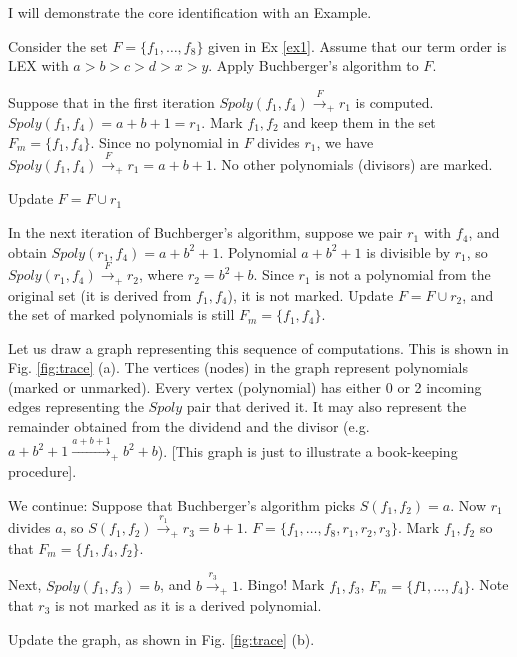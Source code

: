 I will demonstrate the core identification with an Example.

\begin{Example}
Consider the set $F = \{f_1, \dots, f_8\}$ given in Ex
\ref{ex1}. Assume that our term order is LEX with $a > b > c > d > x >
y$.  Apply Buchberger's algorithm to $F$. 

\ben
\item Suppose that in the first
iteration $Spoly(f_1, f_4) \xrightarrow{F}_+r_1$ is computed. 
$Spoly(f_1, f_4) = a+b+1 = r_1$. Mark $f_1, f_2$ and keep them in the
set $F_m = \{f_1, f_4\}$. Since no polynomial
in $F$ divides $r_1$, we have $Spoly(f_1, f_4) \xrightarrow{F}_+ r_1 =
a+b+1$. No other polynomials (divisors) are marked. 

\item Update $F = F \cup r_1$

\item In the next iteration of Buchberger's algorithm, suppose we pair
  $r_1$ with $f_4$, and obtain  $Spoly(r_1, f_4)  = a + b^2 +
  1$. Polynomial $a+b^2+1$ is divisible by $r_1$, so $Spoly(r_1,
  f_4)\xrightarrow{F}_+r_2$, where $r_2 = b^2 + b$. Since $r_1$ is not
  a polynomial from the original set (it is derived from $f_1, f_4$),
  it is not marked. Update $F = F \cup r_2$, and the set of marked
  polynomials is still $F_m = \{f_1, f_4\}$.

\item Let us draw a graph representing this sequence of
  computations. This is shown in Fig. \ref{fig:trace} (a). The
  vertices (nodes) in the graph represent polynomials (marked or
  unmarked). Every vertex (polynomial) has either 0 or 2 incoming
  edges representing the $Spoly$ pair that derived it. It may also
  represent the remainder obtained from the dividend and the divisor
  (e.g. $a+b^2+1 \xrightarrow{a+b+1}_+ b^2+b$). [This graph is just to
    illustrate a book-keeping procedure].

\item We continue: Suppose that Buchberger's algorithm picks
  $S(f_1, f_2)  = a$. Now $r_1$ divides $a$, so $S(f_1, f_2)
  \xrightarrow{r_1}_+ r_3 = b+1$. $F = \{f_1, \dots, f_8, r_1, r_2,
  r_3\}$. Mark $f_1, f_2$ so that $F_m = \{f_1, f_4, f_2\}$. 
\item Next, $Spoly(f_1, f_3) = b$, and $b\xrightarrow{r_3}_+1$. Bingo!
  Mark $f_1, f_3$, $F_m = \{f1, \dots, f_4\}$.  Note that  $r_3$ is not marked as
  it is a derived polynomial. 

\item Update the graph, as  shown in Fig. \ref{fig:trace} (b).



\end{Example}
